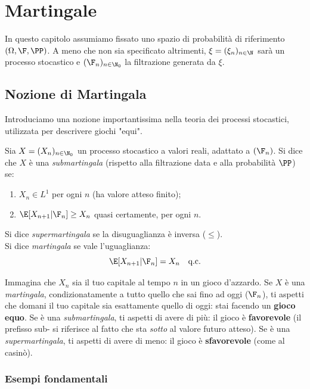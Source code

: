 
\chapter{Martingale}

In questo capitolo assumiamo fissato uno spazio di probabilità di riferimento $(\Omega, \F, \PP)$. A meno che non sia specificato altrimenti, $\xi = (\xi_n)_{n \in \N}$ sarà un processo stocastico e $(\F_n)_{n \in \N_0}$ la filtrazione generata da $\xi$.

\section{Nozione di Martingala}

Introduciamo una nozione importantissima nella teoria dei processi stocastici, utilizzata per descrivere giochi "equi".

\begin{definition}
Sia $X = (X_n)_{n \in \N_0}$ un processo stocastico a valori reali, adattato a $(\F_n)$. Si dice che $X$ è una \emph{submartingala} (rispetto alla filtrazione data e alla probabilità $\PP$) se:
\begin{enumerate}
    \item $X_n \in L^1$ per ogni $n$ (ha valore atteso finito);
    \item $\E[X_{n+1} | \F_n] \ge X_n$ quasi certamente, per ogni $n$.
\end{enumerate}
Si dice \emph{supermartingala} se la disuguaglianza è inversa ($\le$). \\
Si dice \emph{martingala} se vale l'uguaglianza:
\[ \E[X_{n+1} | \F_n] = X_n \quad \text{q.c.} \]
\end{definition}

\begin{spiegazione}
Immagina che $X_n$ sia il tuo capitale al tempo $n$ in un gioco d'azzardo. 
Se $X$ è una \emph{martingala}, condizionatamente a tutto quello che sai fino ad oggi ($\F_n$), ti aspetti che domani il tuo capitale sia esattamente quello di oggi: stai facendo un \textbf{gioco equo}.
Se è una \emph{submartingala}, ti aspetti di avere di più: il gioco è \textbf{favorevole} (il prefisso sub- si riferisce al fatto che sta \emph{sotto} al valore futuro atteso).
Se è una \emph{supermartingala}, ti aspetti di avere di meno: il gioco è \textbf{sfavorevole} (come al casinò).
\end{spiegazione}

\subsection*{Esempi fondamentali}

